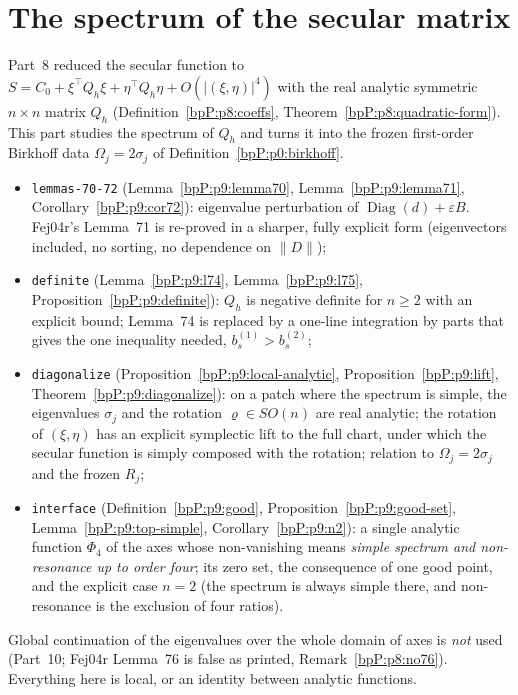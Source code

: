 \section{The spectrum of the secular matrix}\label{bpP:p9}
\begingroup\sloppy

Part~8 reduced the secular function to $S=C_0+\xi^\top Q_h\xi+\eta^\top Q_h\eta+O(|(\xi,\eta)|^4)$ with the real analytic symmetric $n\times n$ matrix $Q_h$ (Definition~\ref{bpP:p8:coeffs}, Theorem~\ref{bpP:p8:quadratic-form}). This part studies the spectrum of $Q_h$ and turns it into the frozen first-order Birkhoff data $\Omega_j=2\sigma_j$ of Definition~\ref{bpP:p0:birkhoff}.
\begin{itemize}
\item \texttt{lemmas-70-72} (Lemma~\ref{bpP:p9:lemma70}, Lemma~\ref{bpP:p9:lemma71}, Corollary~\ref{bpP:p9:cor72}): eigenvalue perturbation of $\operatorname{Diag}(d)+\varepsilon B$. Fej04r's Lemma~71 is re-proved in a sharper, fully explicit form (eigenvectors included, no sorting, no dependence on $\lVert D\rVert$);
\item \texttt{definite} (Lemma~\ref{bpP:p9:l74}, Lemma~\ref{bpP:p9:l75}, Proposition~\ref{bpP:p9:definite}): $Q_h$ is negative definite for $n\ge2$ with an explicit bound; Lemma~74 is replaced by a one-line integration by parts that gives the one inequality needed, $b_{s}^{(1)}>b_{s}^{(2)}$;
\item \texttt{diagonalize} (Proposition~\ref{bpP:p9:local-analytic}, Proposition~\ref{bpP:p9:lift}, Theorem~\ref{bpP:p9:diagonalize}): on a patch where the spectrum is simple, the eigenvalues $\sigma_j$ and the rotation $\varrho\in SO(n)$ are real analytic; the rotation of $(\xi,\eta)$ has an explicit symplectic lift to the full chart, under which the secular function is simply composed with the rotation; relation to $\Omega_j=2\sigma_j$ and the frozen $R_j$;
\item \texttt{interface} (Definition~\ref{bpP:p9:good}, Proposition~\ref{bpP:p9:good-set}, Lemma~\ref{bpP:p9:top-simple}, Corollary~\ref{bpP:p9:n2}): a single analytic function $\Phi_4$ of the axes whose non-vanishing means \emph{simple spectrum and non-resonance up to order four}; its zero set, the consequence of one good point, and the explicit case $n=2$ (the spectrum is always simple there, and non-resonance is the exclusion of four ratios).
\end{itemize}
Global continuation of the eigenvalues over the whole domain of axes is \emph{not} used (Part~10; Fej04r Lemma~76 is false as printed, Remark~\ref{bpP:p8:no76}). Everything here is local, or an identity between analytic functions.


